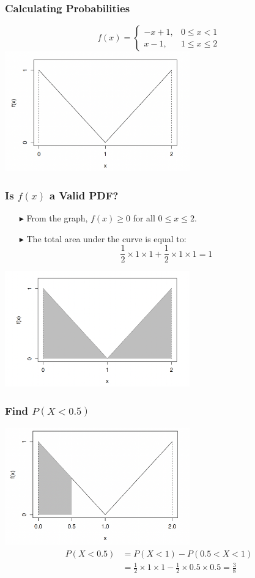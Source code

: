 \documentclass[12pt]{beamer}
\begin{document}
\begin{frame}
	\frametitle{Calculating Probabilities}
\[
f(x) = \begin{cases}
	-x + 1, & 0 \leq x < 1 \\
	x - 1, & 1 \leq x \leq 2
\end{cases}
\]
	\centering
\includegraphics[width=8cm]{pdf5.png}
\end{frame}
\begin{frame}
	\frametitle{Is $f(x)$ a Valid PDF?}
	\begin{itemize}
	\item[\color{blue}$\blacktriangleright$] From the graph, $f(x)\ge0$ for all $0\le x\le2$.
	\item[\color{blue}$\blacktriangleright$] The total area under the curve is equal to:
	$$\frac{1}{2}\times1\times1+\frac{1}{2}\times1\times1=1$$
\end{itemize}
	\centering
	\includegraphics[width=8cm]{pdf6.png}
\end{frame}
\begin{frame}
	\frametitle{Find $P(X<0.5)$}
		\centering
	\includegraphics[width=8cm]{pdf7.png}
		\begin{align*}
		P(X<0.5)&=P(X<1)-P(0.5<X<1)\\
		&=\frac{1}{2}\times1\times1-\frac{1}{2}\times0.5\times0.5=\frac{3}{8}
		\end{align*}
\end{frame}
\end{document}
